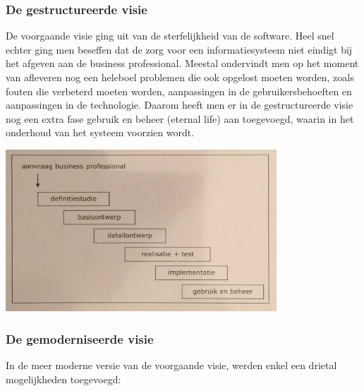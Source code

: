 \subsubsection{De gestructureerde visie}

De voorgaande visie ging uit van de sterfelijkheid van de software. Heel snel echter ging men beseffen dat de zorg voor een informatiesysteem niet eindigt bij het afgeven aan de business professional. Meestal ondervindt men op het moment van afleveren nog een heleboel problemen die ook opgelost moeten worden, zoals fouten die verbeterd moeten worden, aanpassingen in de gebruikersbehoeften en aanpassingen in de technologie. Daarom heeft men er in de gestructureerde visie nog een extra fase gebruik en beheer (eternal life) aan toegevoegd, waarin in het onderhoud van het systeem voorzien wordt.


\begin{center}
\includegraphics[width=4in]{img/IMG_3584}%
\end{center}
\newpage
\subsubsection{De gemoderniseerde visie}

In de meer moderne versie van de voorgaande visie, werden enkel een drietal mogelijkheden toegevoegd:

